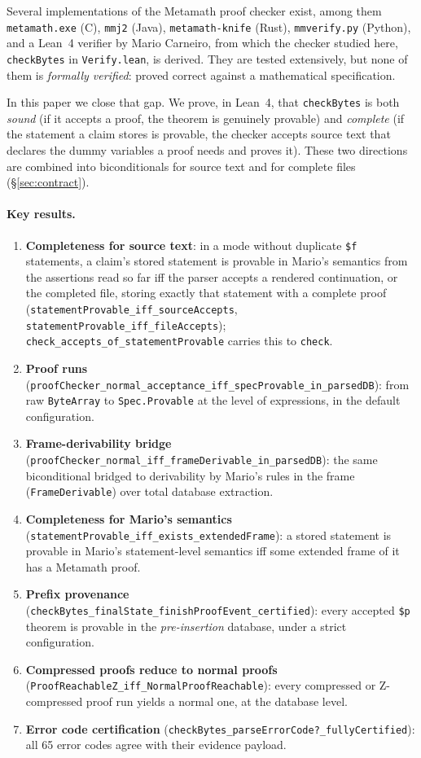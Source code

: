 \documentclass[11pt]{article}
\newcommand{\lean}[1]{\lstinline[language=Lean4]{#1}}
\newcommand{\leansmall}[1]{\lstinline[language=Lean4,basicstyle=\ttfamily\footnotesize]{#1}}
\newcommand{\file}[1]{\texttt{#1}}
\begin{document}
Several implementations of the Metamath proof checker exist, among them
\texttt{metamath.exe} (C), \texttt{mmj2} (Java), \texttt{metamath-knife}
(Rust), \texttt{mmverify.py} (Python), and a Lean~4 verifier by Mario
Carneiro, from which the checker studied here, \lean{checkBytes} in
\file{Verify.lean}, is derived.
They are tested extensively, but none of them is \emph{formally
verified}: proved correct against a mathematical specification.

In this paper we close that gap.  We prove, in Lean~4, that
\lean{checkBytes} is both \emph{sound} (if it accepts a proof,
the theorem is genuinely provable) and \emph{complete} (if the statement
a claim stores is provable, the checker accepts source text that declares
the dummy variables a proof needs and proves it).
These two directions are combined into biconditionals for source text and
for complete files (\S\ref{sec:contract}).

\paragraph{Key results.}
\begin{enumerate}[leftmargin=2em]
\item \textbf{Completeness for source text}:
  in a mode without duplicate \verb|$f| statements, a claim's stored
  statement is provable in Mario's semantics from the assertions read so
  far iff the parser accepts a rendered continuation, or the completed
  file, storing exactly that statement with a complete proof
  (\leansmall{statementProvable_iff_sourceAccepts},
  \leansmall{statementProvable_iff_fileAccepts});
  \leansmall{check_accepts_of_statementProvable} carries this to
  \lean{check}.
\item \textbf{Proof runs}
  (\leansmall{proofChecker_normal_acceptance_iff_specProvable_in_parsedDB}):
  from raw \lean{ByteArray} to \lean{Spec.Provable} at the level of
  expressions, in the default configuration.
\item \textbf{Frame-derivability bridge}
  (\leansmall{proofChecker_normal_iff_frameDerivable_in_parsedDB}):
  the same biconditional bridged to derivability by Mario's rules in
  the frame (\lean{FrameDerivable}) over total database extraction.
\item \textbf{Completeness for Mario's semantics}
  (\leansmall{statementProvable_iff_exists_extendedFrame}):
  a stored statement is provable in Mario's statement-level semantics
  iff some extended frame of it has a Metamath proof.
\item \textbf{Prefix provenance}
  (\leansmall{checkBytes_finalState_finishProofEvent_certified}):
  every accepted \texttt{\$p} theorem is provable in the
  \emph{pre-insertion} database, under a strict configuration.
\item \textbf{Compressed proofs reduce to normal proofs}
  (\lean{ProofReachableZ_iff_NormalProofReachable}):
  every compressed or Z-compressed proof run yields a normal one, at the database level.
\item \textbf{Error code certification}
  (\lean{checkBytes_parseErrorCode?_fullyCertified}):
  all 65 error codes agree with their evidence payload.
\end{enumerate}
\end{document}

